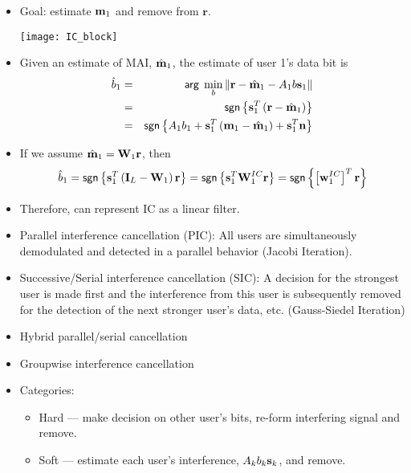 \documentclass[25pt,landscape]{foils}
\newcommand{\br}{{\mathbf r}}
\newcommand{\bbm}{{\bf m}}
\newcommand{\bs}{{\bf s}}
\newcommand{\bn}{{\bf n}}
\newcommand{\bw}{{\bf w}}
\newcommand{\bI}{{\bf I}}
\newcommand{\bW}{{\bf W}}
\begin{document}
\begin{itemize}
\zerolistvertdimens
\item Goal: estimate $\bbm_{1}$ and remove from $\br$.
\centerline{\texttt{[image: IC\_block]}}
\item Given an estimate of MAI, $\hat{\bbm}_{1}$, the estimate of user 1's
data bit is \vspace{-.2in}
\begin{eqnarray*}
\hat{b}_{1} & = & {\sf arg} \; \min_{b} \left\| \br - \hat{\bbm}_{1} -
A_{1}b \bs_{1} \right\| \\
 & = & {\sf sgn} \left\{ \bs_{1}^{T} \left( \br - \hat{\bbm}_{1} \right)
 \right\} \\
 & = & {\sf sgn} \left\{ A_{1}b_{1} + \bs_{1}^{T} \left( \bbm_{1} -
 \hat{\bbm}_{1} \right) + \bs_{1}^{T} \bn \right\}
\end{eqnarray*}
\item If we assume $\hat{\bbm}_{1} = \bW_{1} \br$, then  \vspace{-.2in}
$$
\hat{b}_{1} = {\sf sgn} \left\{ \bs_{1}^{T} \left( \bI_{L} - \bW_{1}
\right) \br \right\} = {\sf sgn} \left\{ \bs_{1}^{T} \bW^{IC}_{1} \br \right\}
 = {\sf sgn} \left\{ \left[\bw_{1}^{IC} \right]^{T} \br \right\}
 \vspace{-.2in}
$$
\item Therefore, can represent IC as a linear filter.
\end{itemize}

\begin{itemize}
\zerolistvertdimens
\item  Parallel interference cancellation (PIC): All users are
simultaneously demodulated and detected in a parallel behavior
(Jacobi Iteration).
\item  Successive/Serial interference cancellation (SIC): A
decision for the strongest user is made first and the interference
from this user is subsequently removed for the detection of the next
stronger user's data, etc.  (Gauss-Siedel Iteration)
\item Hybrid parallel/serial cancellation
\item Groupwise interference cancellation
\item Categories:
 \begin{itemize}
 \item Hard --- make decision on other user's bits, re-form interfering
 signal and remove.
 \item Soft --- estimate each user's interference, $A_{k}b_{k}\bs_{k}$, and
 remove.
 \end{itemize}
\end{itemize}
\end{document}

